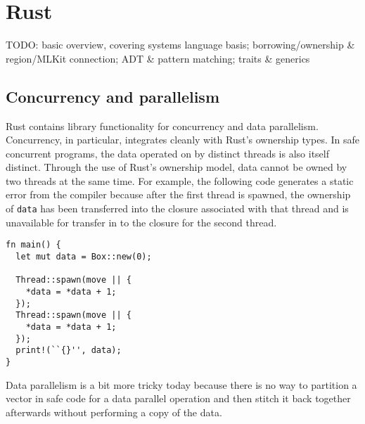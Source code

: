 
\section{Rust}
\label{sec:rust}

TODO: basic overview, covering systems language basis; borrowing/ownership \& region/MLKit connection; ADT \& pattern matching; traits \& generics


\subsection{Concurrency and parallelism}

Rust contains library functionality for concurrency and data parallelism.
Concurrency, in particular, integrates cleanly with Rust's ownership types.
In safe concurrent programs, the data operated on by distinct threads is also itself distinct.
Through the use of Rust's ownership model, data cannot be owned by two threads at the same time.
For example, the following code generates a static error from the compiler because after the first
thread is spawned, the ownership of \lstinline{data} has been transferred into the closure associated
with that thread and is unavailable for transfer in to the closure for the second thread.
\begin{lstlisting}
fn main() {
  let mut data = Box::new(0);

  Thread::spawn(move || {
    *data = *data + 1;
  });
  Thread::spawn(move || {
    *data = *data + 1;
  });
  print!(``{}'', data);
}
\end{lstlisting}

Data parallelism is a bit more tricky today because there is no way to \eg{} partition a vector in safe code
for a data parallel operation and then stitch it back together afterwards without performing a copy of the data.


